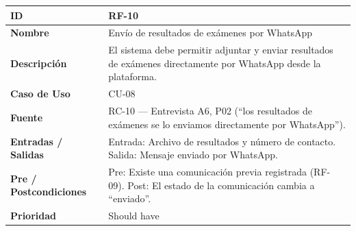\documentclass[
]{article}
\newcounter{none} %
\begin{document}
{\def\LTcaptype{none} %
\begin{longtable}[]{|
  >{\raggedright\arraybackslash}p{}|
  >{\raggedright\arraybackslash}p{}|}
\hline
\begin{minipage}[b]{\linewidth}\raggedright
\textbf{ID}
\end{minipage} & \begin{minipage}[b]{\linewidth}\raggedright
RF-10
\end{minipage} \\
\hline
\endhead
\hline
\endlastfoot
\textbf{Nombre} & \begin{minipage}[t]{\linewidth}\raggedright
Envío de resultados de exámenes por WhatsApp
\end{minipage} \\
\hline
\textbf{Descripción} & \begin{minipage}[t]{\linewidth}\raggedright
El sistema debe permitir adjuntar y enviar resultados de exámenes directamente por WhatsApp desde la plataforma.
\end{minipage} \\
\hline
\textbf{Caso de Uso} & \begin{minipage}[t]{\linewidth}\raggedright
CU-08
\end{minipage} \\
\hline
\textbf{Fuente} & \begin{minipage}[t]{\linewidth}\raggedright
RC-10 — Entrevista A6, P02 (“los resultados de exámenes se lo enviamos directamente por WhatsApp”).
\end{minipage} \\
\hline
\textbf{Entradas / Salidas} & \begin{minipage}[t]{\linewidth}\raggedright
Entrada: Archivo de resultados y número de contacto. Salida: Mensaje enviado por WhatsApp.
\end{minipage} \\
\hline
\textbf{Pre / Postcondiciones} & \begin{minipage}[t]{\linewidth}\raggedright
Pre: Existe una comunicación previa registrada (RF-09). Post: El estado de la comunicación cambia a “enviado”.
\end{minipage} \\
\hline
\textbf{Prioridad} & \begin{minipage}[t]{\linewidth}\raggedright
Should have
\end{minipage} \\

\end{longtable}}
\end{document}
